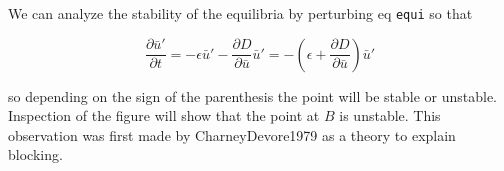 We can analyze the stability of the equilibria by perturbing eq
\texttt{equi} so that

\[\frac{\partial \bar{u}'}{\partial t} = -\epsilon\bar{u}' -\frac{\partial D}{\partial \bar{u}}\bar{u}' = -\left(\epsilon +\frac{\partial D}{\partial \bar{u}}\right)\bar{u}'\]

so depending on the sign of the parenthesis the point will be stable or
unstable. Inspection of the figure will show that the point at \(B\) is
unstable. This observation was first made by CharneyDevore1979 as a
theory to explain blocking.

